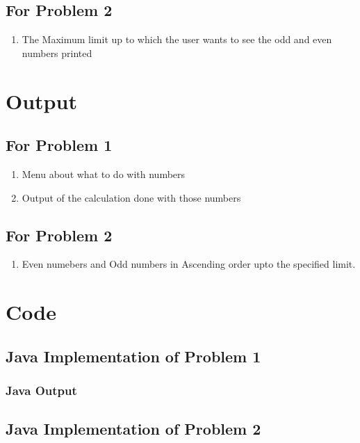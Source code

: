 \documentclass[11pt]{article}
\begin{document}
\subsection*{For Problem 2}
\begin{enumerate}
	\item The Maximum limit up to which the user wants to see the odd and even numbers printed
\end{enumerate}

\section{Output}
\subsection*{For Problem 1}
\begin{enumerate}
	\item Menu about what to do with numbers
	\item Output of the calculation done with those numbers
\end{enumerate}
\subsection*{For Problem 2}
\begin{enumerate}
	\item Even numebers and Odd numbers in Ascending order upto the specified limit. 
\end{enumerate}


\section{Code}

\subsection{Java Implementation of Problem 1}



\subsubsection{Java Output}


\subsection{Java Implementation of Problem 2}
\end{document}
